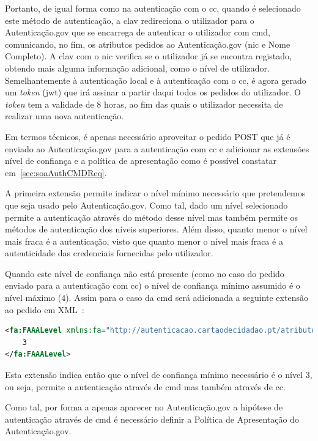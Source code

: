 Portanto, de igual forma como na autenticação com o \acrshort{cc}, quando é selecionado este método de autenticação, a \acrshort{clav} redireciona o utilizador para o Autenticação.gov que se encarrega de autenticar o utilizador com \acrshort{cmd}, comunicando, no fim, os atributos pedidos ao Autenticação.gov (\acrshort{nic} e Nome Completo). A \acrshort{clav} com o \acrshort{nic} verifica se o utilizador já se encontra registado, obtendo mais alguma informação adicional, como o nível de utilizador. Semelhantemente à autenticação local e à autenticação com o \acrshort{cc}, é agora gerado um \textit{token} (\acrshort{jwt}) que irá assinar a partir daqui todos os pedidos do utilizador. O \textit{token} tem a validade de 8 horas, ao fim das quais o utilizador necessita de realizar uma nova autenticação.

Em termos técnicos, é apenas necessário aproveitar o pedido POST que já é enviado ao Autenticação.gov para a autenticação com \acrshort{cc} e adicionar as extensões nível de confiança e a política de apresentação como é possível constatar em~\ref{sec:soaAuthCMDReq}.

A primeira extensão permite indicar o nível mínimo necessário que pretendemos que seja usado pelo Autenticação.gov. Como tal, dado um nível selecionado permite a autenticação através do método desse nível mas também permite os métodos de autenticação dos níveis superiores. Além disso, quanto menor o nível mais fraca é a autenticação, visto que quanto menor o nível mais fraca é a autenticidade das credenciais fornecidas pelo utilizador.

Quando este nível de confiança não está presente (como no caso do pedido enviado para a autenticação com \acrshort{cc}) o nível de confiança mínimo assumido é o nível máximo (4). Assim para o caso da \acrshort{cmd} será adicionada a seguinte extensão ao pedido em XML~\cite{agov2}:
\begin{lstlisting}[language=xml, caption=Extensão Nível de Confiança no pedido enviado ao Autenticação.gov]
<fa:FAAALevel xmlns:fa="http://autenticacao.cartaodecidadao.pt/atributos">
    3
</fa:FAAALevel>
\end{lstlisting}
Esta extensão indica então que o nível de confiança mínimo necessário é o nível 3, ou seja, permite a autenticação através de \acrshort{cmd} mas também através de \acrshort{cc}.

Como tal, por forma a apenas aparecer no Autenticação.gov a hipótese de autenticação através de \acrshort{cmd} é necessário definir a Política de Apresentação do Autenticação.gov.

